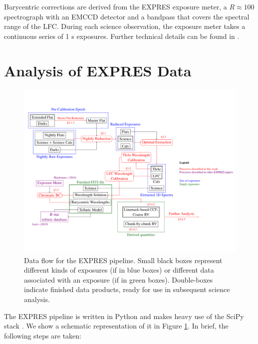 Barycentric corrections are derived from the EXPRES exposure meter, a $R\approx100$ spectrograph with an EMCCD detector and a bandpass that covers the spectral range of the LFC. During each science observation, the exposure meter takes a continuous series of 1 s exposures. Further technical details can be found in \citet{blackman_measured_2019}.

\hypertarget{analysis-of-expres-data}{%
\section{Analysis of EXPRES Data}\label{analysis-of-expres-data}}

\begin{figure}
    \centering
    \includegraphics[width=\textwidth]{figures-4/pipeline}
    \caption{Data flow for the EXPRES pipeline. Small black boxes represent different kinds of exposures (if in blue boxes) or different data associated with an exposure (if in green boxes). Double-boxes indicate finished data products, ready for use in subsequent science analysis.\label{fig:flowchart}}
\end{figure}

The EXPRES pipeline is written in Python and makes heavy use of the SciPy stack \citep{virtanen_scipy_2020}. We show a schematic representation of it in Figure \ref{fig:flowchart}. In brief, the following steps are taken:


